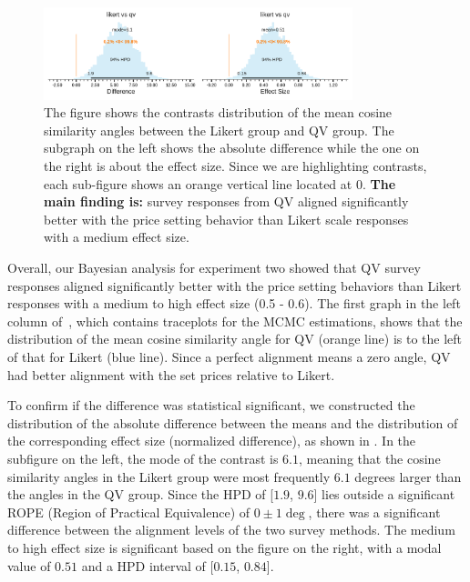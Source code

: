 \begin{figure}[htpb]
  \centering
  \includegraphics[trim= 0in 0in 0in 0in, clip, width=0.8\textwidth, keepaspectratio=true]{"content/image/Votes_Prices_StudentT_differences_and_effects.pdf"}
  \caption{
    The figure shows the contrasts distribution of the mean cosine similarity angles between the Likert group and QV group. The subgraph on the left shows the absolute difference while the one on the right is about the effect size. Since we are highlighting contrasts, each sub-figure shows an orange vertical line located at 0. \textbf{The main finding is:} survey responses from QV aligned significantly better with the price setting behavior than Likert scale responses with a medium effect size.
  }
  \label{fig:contrast_exp2}
\end{figure}

Overall, our Bayesian analysis for experiment two showed that QV survey responses aligned significantly better with the price setting behaviors than Likert responses with a medium to high effect size (0.5 - 0.6). The first graph in the left column of~, which contains traceplots for the MCMC estimations, shows that the distribution of the mean cosine similarity angle for QV (orange line) is to the left of that for Likert (blue line). Since a perfect alignment means a zero angle, QV had better alignment with the set prices relative to Likert. 

To confirm if the difference was statistical significant, we constructed the distribution of the absolute difference between the means and the distribution of the corresponding effect size (normalized difference), as shown in . In the subfigure on the left, the mode of the contrast is $6.1$, meaning that the cosine similarity angles in the Likert group were most frequently $6.1$ degrees larger than the angles in the QV group. Since the HPD of [$1.9$, $9.6$] lies outside a significant ROPE (Region of Practical Equivalence) of $0 \pm 1 \deg$, there was a significant difference between the alignment levels of the two survey methods. The medium to high effect size is significant based on the figure on the right, with a modal value of $0.51$ and a HPD interval of [$0.15$, $0.84$].


